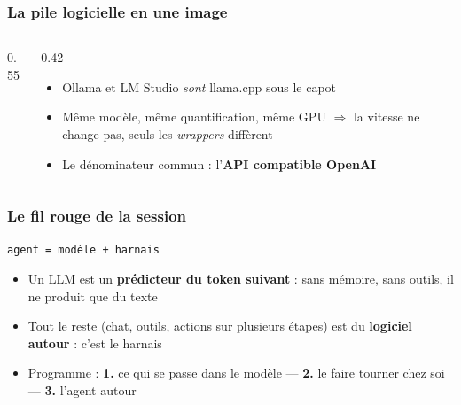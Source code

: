 \documentclass[
	11pt,
	aspectratio=169
]{beamer}
\begin{document}
\begin{frame}
    \frametitle{La pile logicielle en une image}
    \begin{columns}[c]
        \begin{column}{0.55\textwidth}
            \centering
        \end{column}
        \begin{column}{0.42\textwidth}
            \begin{itemize}\setlength\itemsep{0.6em}
                \item Ollama et LM Studio \emph{sont} llama.cpp sous le capot
                \item Même modèle, même quantification, même GPU $\Rightarrow$ la vitesse ne change pas, seuls les \emph{ wrappers } diffèrent
                \item Le dénominateur commun : l'\textbf{API compatible OpenAI}
            \end{itemize}
        \end{column}
    \end{columns}
\end{frame}

\begin{frame}
    \frametitle{Le fil rouge de la session}
    \begin{center}
        {\Large \texttt{agent = modèle + harnais}}
    \end{center}
    \bigskip
    \begin{itemize}\setlength\itemsep{0.5em}
        \item Un LLM est un \textbf{prédicteur du token suivant} : sans mémoire, sans outils, il ne produit que du texte
        \item Tout le reste (chat, outils, actions sur plusieurs étapes) est du \textbf{logiciel autour} : c'est le harnais
        \item Programme : \textbf{1.} ce qui se passe dans le modèle --- \textbf{2.} le faire tourner chez soi --- \textbf{3.} l'agent autour
    \end{itemize}
\end{frame}
\end{document}
